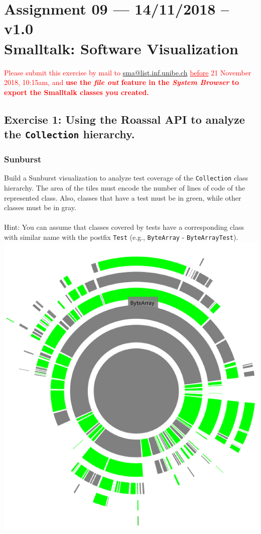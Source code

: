 \documentclass [11pt, a4wide, twoside]{article}
\begin{document}
\section*{Assignment 09 --- 14/11/2018 -- v1.0\\Smalltalk: Software Visualization}

\textcolor{red}{Please submit this exercise by mail to \href{mailto:sma@list.inf.unibe.ch}{sma@list.inf.unibe.ch} \underline{before} 21 November 2018, 10:15am, and \textbf{use the \textit{file out} feature in the \textit{System Browser} to export the Smalltalk classes you created.}}

\subsection*{Exercise 1: Using the Roassal API to analyze the \texttt{Collection} hierarchy.}
\subsubsection*{Sunburst}
Build a Sunburst visualization to analyze test coverage of the \texttt{Collection} class hierarchy. The area of the tiles must encode the number of lines of code of the represented class. Also, classes that have a test must be in green, while other classes must be in gray. \\ \\
Hint: You can assume that classes covered by tests have a corresponding class with similar name with the postfix \texttt{Test} (e.g., \texttt{ByteArray} - \texttt{ByteArrayTest}). \\

\includegraphics[scale=0.2]{images/sunburst.png}
\end{document}
